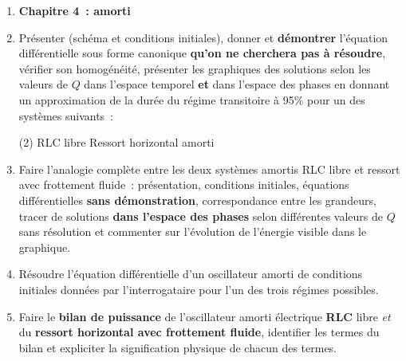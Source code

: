 \documentclass[a4paper, 12pt, final, garamond]{book}
\begin{document}
\begin{enumerate}
  \item[] \textbf{Chapitre 4~: amorti}
  \item Présenter (schéma et conditions initiales),
        donner et \textbf{démontrer} l'équation différentielle sous
        forme canonique \textbf{qu'on ne cherchera pas à résoudre}, vérifier son
        homogénéité, présenter les graphiques des solutions selon les valeurs de
        $Q$ dans l'espace temporel \textbf{et} dans l'espace des phases en donnant
        un approximation de la durée du régime transitoire à 95\% pour un des
        systèmes suivants~:
	      \begin{tasks}[label=\protect\fbox{\Alph*}, label-width=4ex](2)
		      \task RLC libre
		      \task Ressort horizontal amorti
	      \end{tasks}

  \item Faire l'analogie complète entre les deux systèmes amortis RLC libre et
        ressort avec frottement fluide~: présentation, conditions initiales,
        équations différentielles \textbf{sans démonstration}, correspondance
        entre les grandeurs, tracer de solutions \textbf{dans l'espace des
        phases} selon différentes valeurs de $Q$ sans résolution et commenter
        sur l'évolution de l'énergie visible dans le graphique.

  \item Résoudre l'équation différentielle d'un oscillateur amorti de conditions
        initiales données par l'interrogataire pour l'un des trois régimes
        possibles.

  \item Faire le \textbf{bilan de puissance} de l'oscillateur amorti électrique
        \textbf{RLC} libre \textit{et} du \textbf{ressort horizontal avec frottement
        fluide}, identifier les termes du bilan et expliciter la signification
        physique de chacun des termes.
\end{enumerate}
\end{document}
